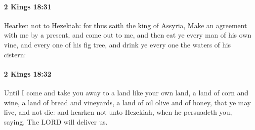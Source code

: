 		\paragraph{2 Kings 18:31} %
			\label{2KINGS-18-31}

			Hearken not to Hezekiah: for thus saith the king of Assyria, Make an agreement with me by a present, and come out to me, and then eat ye every man of his own vine, and every one of his fig tree, and drink ye every one the waters of his cistern:


		\paragraph{2 Kings 18:32} %
			\label{2KINGS-18-32}

			Until I come and take you away to a land like your own land, a land of corn and wine, a land of bread and vineyards, a land of oil olive and of honey, that ye may live, and not die: and hearken not unto Hezekiah, when he persuadeth you, saying, The LORD will deliver us.

